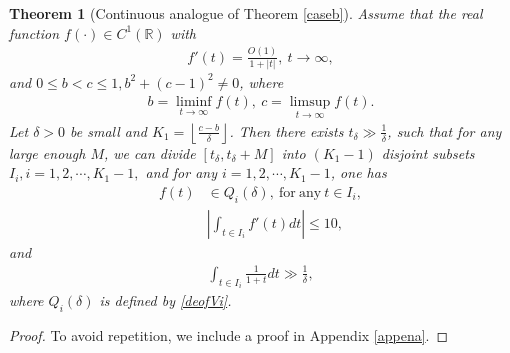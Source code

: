 \documentclass[12pt]{amsart}
\newcommand{\abs}[1]{\left\lvert #1 \right\rvert}
\theoremstyle{plain}
\newtheorem{theorem}{Theorem}[section]
\newcommand{\R}{\mathbb{R}}
\theoremstyle{definition}
\begin{document}
\begin{theorem}[Continuous analogue of Theorem \ref{caseb}]\label{thmcontinuous} Assume that the real function $f(\cdot)\in C^1(\R)$ with
	\begin{align}
		f'(t)=\frac{O(1)}{1+\abs{t}},\ t\to\infty,\label{apfprO}
	\end{align}
	 and $0\leq b<c\leq 1,b^2+(c-1)^2\neq 0$, where
	\begin{align}
		b=\liminf_{t\to\infty}f(t),\ c=\limsup_{t\to\infty}f(t).\nonumber
	\end{align} Let $\delta>0$ be small and $K_1=\left \lfloor \frac{c-b}{\delta} \right \rfloor$. Then there exists $t_\delta\gg \frac{1}{\delta}$, such that for any large enough $M$, we can divide $[t_{\delta},t_{\delta}+M]$ into $(K_1-1)$ disjoint subsets $I_i, i=1,2,\cdots,K_1-1,$ and for any $i=1,2,\cdots,K_1-1$, one has
	\begin{align}
		f(t)&\in Q_i(\delta),\ \mathrm{for\ any}\ t\in I_i,\label{appeniinvia}\\
		&\abs{\int_{t\in I_i}f'(t)dt}\leq 10,\label{appenee}
	\end{align}
	and 
	\begin{align}
	\int_{t\in I_i}\frac{1}{1+t}dt\gg \frac{1}{\delta},\label{appenIifractionlargecasec}
	\end{align}
	where $Q_i(\delta)$ is defined by \eqref{deofVi}.
\end{theorem}
\begin{proof}
To avoid repetition, we include a proof in Appendix \ref{appena}.
\end{proof}
\end{document}
